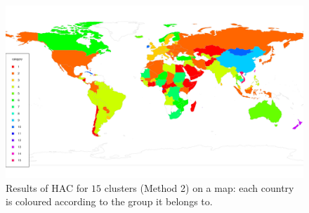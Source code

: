 \documentclass[a4paper,12pt]{article}
\numberwithin{equation}{section}
\begin{document}
\begin{figure}[t!]
\begin{minipage}[t]{0.98\textwidth}
\includegraphics[width=\textwidth]{plots/choropleth_alt_15}
\caption{Results of HAC for $15$ clusters (Method 2) on a map: each country is coloured according to the group it belongs to.}\label{fig:map_alt_15cl}
\end{minipage}
\end{figure}
\end{document}
